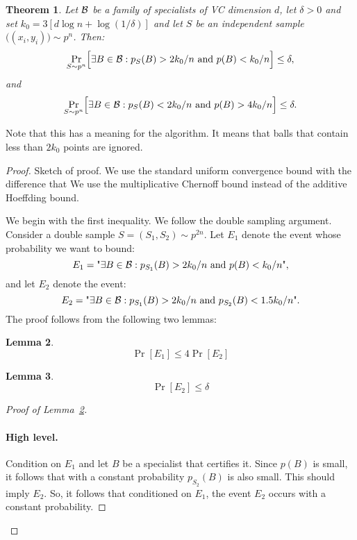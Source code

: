 \documentclass{article}
\newtheorem{theorem}{Theorem}[section]
\newtheorem{lemma}[theorem]{Lemma}
\newcommand{\B}{{\cal B}}
\newcommand{\samp}{S}
\begin{document}
\begin{theorem}\label{thm:uc1}
Let $\B$ be a family of specialists of VC dimension $d$,
let $\delta>0$ and set $k_0=3\left[  d \log n + \log(1/\delta) \right]$
and let $S$ be an independent sample $\bigl((x_i,y_i)\bigr) \sim p^n$. Then:
\[\Pr_{\samp \sim p^{n}}\Bigl[\exists {B\in\B}:
  p_{\samp}(B)>2k_0/n \mbox{ and } p(B) < k_0/n \Bigr] \leq \delta,
\]
and
\[\Pr_{\samp \sim p^{n}}\Bigl[\exists {B\in\B}:
  p_{\samp}(B)< 2k_0/n \mbox{ and } p(B) > 4k_0/n \Bigr] \leq \delta.
\]
\end{theorem}



Note that this has a meaning for the algorithm. It means that balls
that contain less than $2k_0$ points are ignored.

\begin{proof}
Sketch of proof. We use the standard uniform convergence bound with
the difference that We use the multiplicative Chernoff bound instead
 of the additive Hoeffding bound. 

We begin with the first inequality.  
We follow the double sampling argument.
Consider a double sample $S=(\samp_1,\samp_2)\sim p^{2n}$.
Let $E_1$ denote the event whose probability we want to bound:
\[
E_1 = \text{"}\exists {B\in\B}:
  p_{\samp_1}(B)>2k_0/n \mbox{ and } p(B) < k_0/n
\text{"}, 
\]
and let $E_2$ denote the event:
\[
E_2 = \text{"}\exists {B\in\B}:
  p_{\samp_1}(B)>2k_0/n \mbox{ and } p_{\samp_2}(B) < 1.5k_0/n
\text{"}.
\]
The proof follows from the following two lemmas:
\begin{lemma}\label{lem:auxuc1}
\[\Pr[E_1]\leq 4\Pr[E_2]\]
\end{lemma}
\begin{lemma}\label{lem:auxuc2}
\[\Pr[E_2]\leq \delta\]
\end{lemma}

\begin{proof}[Proof of Lemma~\ref{lem:auxuc1}]\ \\

\paragraph{High level.}
Condition on $E_1$ and let $B$ be a specialist that certifies it.
Since $p(B)$ is small, it follows that with a constant probability
$p_{\samp_2}(B)$ is also small.
This should imply $E_2$.
So, it follows that conditioned on $E_1$, 
the event $E_2$ occurs with a constant probability.

\end{proof}



\end{proof}
\end{document}
